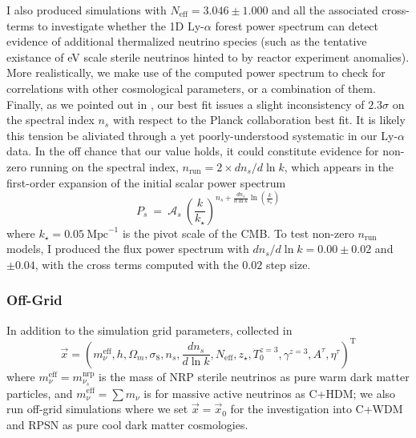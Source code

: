 I also produced simulations with $N_{\mathrm{eff}} = 3.046 \pm 1.000$ and all the associated cross-terms to investigate whether the 1D Ly-$\alpha$ forest power spectrum can detect evidence of additional thermalized neutrino species (such as the tentative existance of eV scale sterile neutrinos hinted to by reactor experiment anomalies). More realistically, we make use of the computed power spectrum to check for correlations with other cosmological parameters, or a combination of them.\\

Finally, as we pointed out in \cite{Palanque2015b}, our best fit issues a slight inconsistency of $2.3 \sigma$ on the spectral index $n_s$ with respect to the Planck collaboration best fit. It is likely this tension be aliviated through a yet poorly-understood systematic in our Ly-$\alpha$ data. In the off chance that our value holds, it could constitute evidence for non-zero running on the spectral index, $n_{\mathrm{run}} = 2 \times d n_s / d \ln k$, which appears in the first-order expansion of the initial scalar power spectrum
\begin{equation}
\label{eq:PS_nrun}
P_s ~=~ \mathcal{A}_s ~\left( \frac{k}{k_\star} \right)^{n_s + \frac{d n_s}{d \ln k} \ln \left( \frac{k}{k_\star} \right)}
\end{equation} 
where $k_\star = 0.05 ~\mathrm{Mpc}^{-1}$ is the pivot scale of the CMB. To test non-zero $n_{\mathrm{run}}$ models, I produced the flux power spectrum with $d n_s / d \ln k = 0.00 \pm 0.02$ and $\pm 0.04$, with the cross terms computed with the $0.02$ step size. 

\subsubsection{Off-Grid}
\label{sec:offgrid}

In addition to the simulation grid parameters, collected in
\begin{equation}
\vec{x} = \left( m_\nu^{\mathrm{eff}}, h, \Omega_m, \sigma_8, n_s, \frac{d n_s}{d \ln k}, N_{\mathrm{eff}}, z_\star, T_0^{z=3}, \gamma^{z=3}, A^\tau, \eta^\tau \right)^{\mathrm{T}}
\end{equation} where $m_\nu^{\mathrm{eff}} = m^{\mathrm{nrp}}_{\nu_s}$ is the mass of NRP sterile neutrinos as pure warm dark matter particles, and $m_\nu^{\mathrm{eff}} = \sum m_\nu$ is for massive active neutrinos as C+HDM; we also run off-grid simulations where we set $\vec{x} = \vec{x}_0$ for the investigation into C+WDM and RPSN as pure cool dark matter cosmologies. \\

